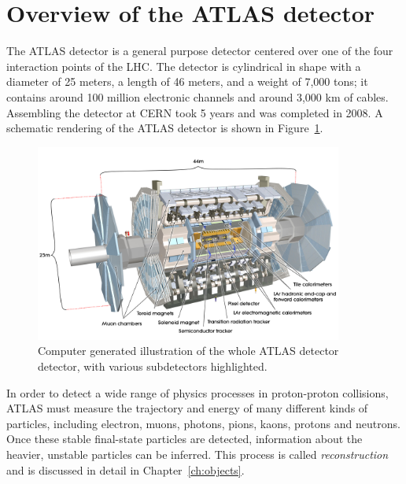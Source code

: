 \section{Overview of the ATLAS detector}
The ATLAS detector is a general purpose detector centered over one of the four interaction points of the LHC. The detector is cylindrical in shape with a diameter of 25 meters, a length of 46 meters, and a weight of 7,000 tons; it contains around 100 million electronic channels and around 3,000 km of cables. Assembling the detector at CERN took 5 years and was completed in 2008. A schematic rendering of the ATLAS detector is shown in Figure~\ref{fig:atlas-cgi}.
\begin{figure}[tp]
  \centering
  \includegraphics[width=0.90\textwidth]{fig/atlas/atlaspic.jpg}
  \caption{Computer generated illustration of the whole ATLAS detector detector, with various subdetectors highlighted\cite{Pequenao:1095924}.}
  \label{fig:atlas-cgi}
\end{figure}
In order to detect a wide range of physics processes in proton-proton collisions, ATLAS must measure the trajectory and energy of many different kinds of particles, including electron, muons, photons, pions, kaons, protons and neutrons. Once these stable final-state particles are detected, information about the heavier, unstable particles can be inferred. This process is called \emph{reconstruction} and is discussed in detail in Chapter~\ref{ch:objects}.

